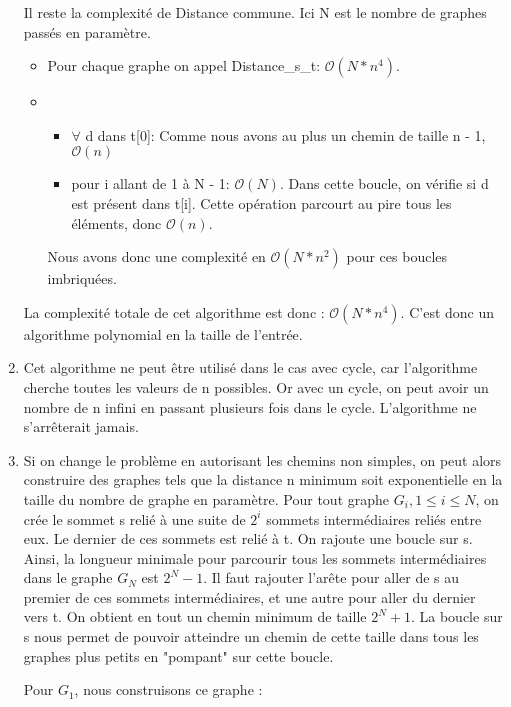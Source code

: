 \documentclass{article}
\begin{document}
\begin{enumerate}
Il reste la complexité de Distance commune. Ici N est le nombre de graphes passés en paramètre.
\begin{itemize}
    \item 
    Pour chaque graphe on appel Distance\_s\_t: $\mathcal{O}(N * n^4)$.
    \item
    \begin{itemize}
        \item 
        $\forall$ d dans t[0]: Comme nous avons au plus un chemin de taille n - 1, $\mathcal{O}(n)$
        \item
        pour i allant de 1 à N - 1: $\mathcal{O}(N)$. Dans cette boucle, on vérifie si d est présent dans t[i].
        Cette opération parcourt au pire tous les éléments, donc $\mathcal{O}(n)$.
    \end{itemize}
    Nous avons donc une complexité en $\mathcal{O}(N * n^2)$ pour ces boucles imbriquées.
\end{itemize}
La complexité totale de cet algorithme est donc : $\mathcal{O}(N * n^4)$. C'est donc un algorithme polynomial en la taille de l'entrée.
\item
Cet algorithme ne peut être utilisé dans le cas avec cycle, car l'algorithme cherche toutes les valeurs de n possibles. Or avec un cycle, on peut avoir un nombre de n infini en passant plusieurs fois dans le cycle. L'algorithme ne s'arrêterait jamais.

\item 
Si on change le problème en autorisant les chemins non simples, on peut alors construire des graphes tels que la distance n minimum soit exponentielle en la taille du nombre de graphe en paramètre. Pour tout graphe $G_i, 1 \le i \le N$, on crée le sommet s relié à une suite de $2^i$ sommets intermédiaires reliés entre eux. Le dernier de ces sommets est relié à t. On rajoute une boucle sur s. Ainsi, la longueur minimale pour parcourir tous les sommets intermédiaires dans le graphe $G_N$ est $2^N - 1$. Il faut rajouter l'arête pour aller de s au premier de ces sommets intermédiaires, et une autre pour aller du dernier vers t. On obtient en tout un chemin minimum de taille $2^N + 1$. La boucle sur s nous permet de pouvoir atteindre un chemin de cette taille dans tous les graphes plus petits en "pompant" sur cette boucle.

\newpage
Pour $G_1$, nous construisons ce graphe :
\end{enumerate}
\end{document}
